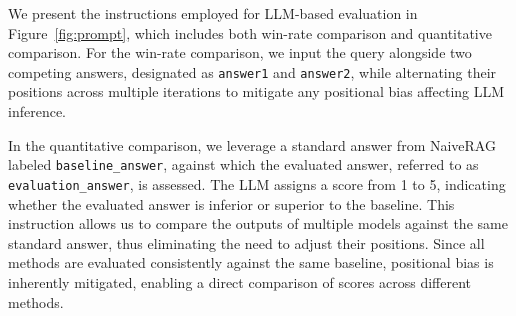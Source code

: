 

We present the instructions employed for LLM-based evaluation in Figure~\ref{fig:prompt}, which includes both win-rate comparison and quantitative comparison. For the win-rate comparison, we input the query alongside two competing answers, designated as \texttt{answer1} and \texttt{answer2}, while alternating their positions across multiple iterations to mitigate any positional bias affecting LLM inference.

In the quantitative comparison, we leverage a standard answer from NaiveRAG~\cite{NaiveRAG} labeled \texttt{baseline\_answer}, against which the evaluated answer, referred to as \texttt{evaluation\_answer}, is assessed. The LLM assigns a score from 1 to 5, indicating whether the evaluated answer is inferior or superior to the baseline. This instruction allows us to compare the outputs of multiple models against the same standard answer, thus eliminating the need to adjust their positions. Since all methods are evaluated consistently against the same baseline, positional bias is inherently mitigated, enabling a direct comparison of scores across different methods.

